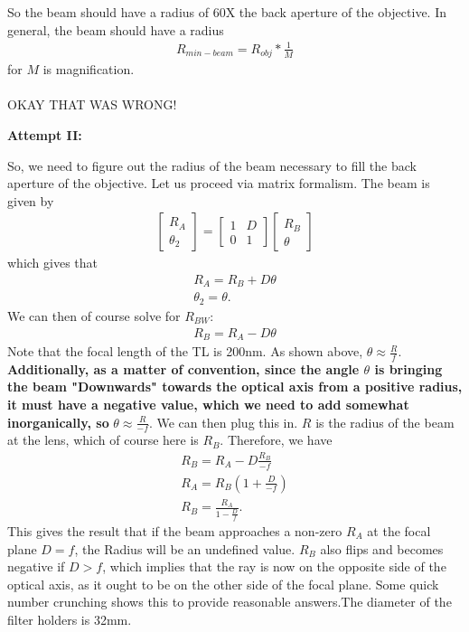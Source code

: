So the beam should have a radius of 60X the back aperture of the objective. In general, the beam should have a radius
\begin{gather}
    R_{min-beam}=R_{obj}*\frac{1}{M}
\end{gather}
for $M$ is magnification.\\\\
OKAY THAT WAS WRONG!\\
\begin{center} \textbf{Attempt II:} \end{center}
So, we need to figure out the radius of the beam necessary to fill the back aperture of the objective. Let us proceed via matrix formalism. The beam is given by 
\begin{gather}
    \begin{bmatrix}
        R_{A} \\ \theta_2
    \end{bmatrix}
    =
    \begin{bmatrix}
        1 & D\\ 0 & 1 
    \end{bmatrix}
      \begin{bmatrix}
       R_{B} \\ \theta
    \end{bmatrix}
\end{gather}
which gives that 
\begin{gather}
    R_{A}=R_{B} + D\theta\\
    \theta_2 = \theta.
\end{gather}
We can then of course solve for $R_{BW}$:
\begin{gather}
    R_{B} = R_{A}- D\theta
\end{gather}
Note that the focal length of the TL is 200nm. As shown above, $\theta \approx \frac{R}{f}$.\textbf{ Additionally, as a matter of convention, since the angle $\theta$ is bringing the beam "Downwards" towards the optical axis from a positive radius, it must have a negative value, which we need to add somewhat inorganically, so} $\theta \approx \frac{R}{-f}$. We can then plug this in. $R$ is the radius of the beam at the lens, which of course here is $R_B$. Therefore, we have
\begin{gather}
     R_{B} = R_{A}- D\frac{R_B}{-f}\\
     R_A = R_B (1+\frac D {-f})\\
     R_B = \frac{R_A}{1-\frac D f}.
\end{gather}
This gives the result that if the beam approaches a non-zero $R_A$ at the focal plane $D=f$, the Radius will be an undefined value. $R_B$ also flips and becomes negative if $D>f$, which implies that the ray is now on the opposite side of the optical axis, as it ought to be on the other side of the focal plane. Some quick number crunching shows this to provide reasonable answers.The diameter of the filter holders is 32mm.
